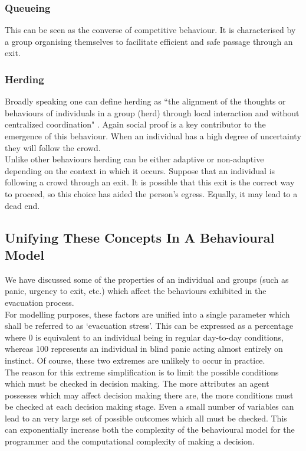 \subsubsection{Queueing}
\label{Res:subsubsec:queueing}
This can be seen as the converse of competitive behaviour. It is characterised by a group organising themselves to facilitate efficient and safe passage through an exit.
\subsubsection{Herding}
\label{Res:subsubsec:herding}
Broadly speaking one can define herding as ``the alignment of the thoughts or behaviours of individuals in a group (herd) through local interaction and without centralized coordination" \cite{HerdingInHumans}. Again social proof is a key contributor to the emergence of this behaviour. When an individual has a high degree of uncertainty they will follow the crowd.\\

Unlike other behaviours herding can be either adaptive or non-adaptive depending on the context in which it occurs. Suppose that an individual is following a crowd through an exit. It is possible that this exit is the correct way to proceed, so this choice has aided the person's egress. Equally, it may lead to a dead end.

\subsection{Unifying These Concepts In A Behavioural Model}
\label{Res:subsec:unifyingParameters}
We have discussed some of the properties of an individual and groups (such as panic, urgency to exit, etc.) which affect the behaviours exhibited in the evacuation process.\\

For modelling purposes, these factors are unified into a single parameter which shall be referred to as `evacuation stress'. This can be expressed as a percentage where 0 is equivalent to an individual being in regular day-to-day conditions, whereas 100 represents an individual in blind panic acting almost entirely on instinct. Of course, these two extremes are unlikely to occur in practice.\\

The reason for this extreme simplification is to limit the possible conditions which must be checked in decision making. The more attributes an agent possesses which may affect decision making there are, the more conditions must be checked at each decision making stage. Even a small number of variables can lead to an very large set of possible outcomes which all must be checked. This can exponentially increase both the complexity of the behavioural model for the programmer and the computational complexity of making a decision.

